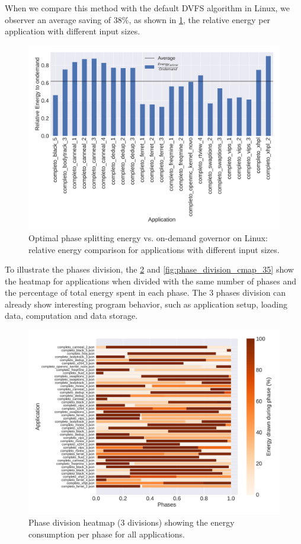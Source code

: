 When we compare this method with the default DVFS algorithm in Linux, we observer an average saving of 38\%, as shown in \cref{fig:cmp_ondemand}, the relative energy per application with different input sizes.

\begin{figure}[H]
	\centering
	\includegraphics[width=\columnwidth]{phases/figures/comparison_ondemand.pdf}
	\caption{Optimal phase splitting energy vs. on-demand governor on Linux: relative energy comparison for applications with different input sizes.}
	\label{fig:cmp_ondemand}
\end{figure}

To illustrate the phases division, the \cref{fig:phase_division_cmap_3} and \cref{fig:phase_division_cmap_35} show the heatmap for applications when divided with the same number of phases and the percentage of total energy spent in each phase.  The 3 phases division can already show interesting program behavior, such as application setup, loading data, computation and data storage.

\begin{figure}[H]
	\includegraphics[width=\columnwidth]{phases/figures/phase_division_cmap_3.pdf}
	\caption{Phase division heatmap (3 divisions) showing the energy consumption per phase for all applications.}
	\label{fig:phase_division_cmap_3}
\end{figure}

